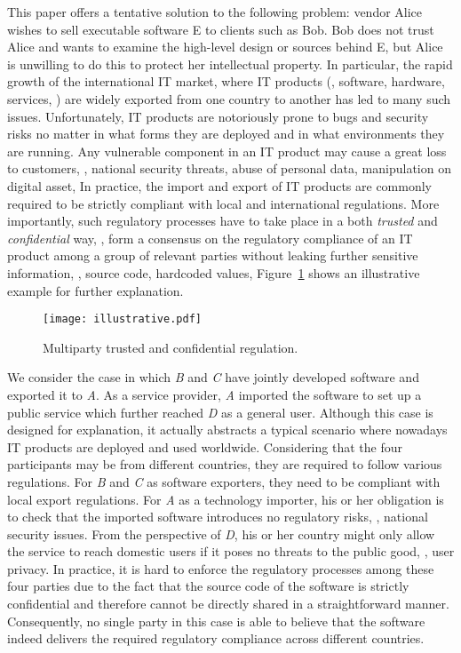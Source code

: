 This paper offers a tentative solution to the following problem: vendor Alice wishes to sell executable software E to clients such as Bob. Bob does not trust Alice and wants to examine the high-level design or sources behind E, but Alice is unwilling to do this to protect her intellectual property. 
In particular, the rapid growth of the international IT market, where IT products (\eg, software, hardware, services, \etc) 
are widely exported from one country to another has led to many such issues. Unfortunately, IT 
products are notoriously prone to bugs and security risks no matter in what 
forms they are deployed and in what environments they are running. Any vulnerable component 
in an IT product may cause a great loss to customers, \eg, national security 
threats, abuse of personal data, manipulation on digital asset, \etc In practice, the 
import and export of IT products are commonly required to be strictly compliant with 
local and international regulations. More importantly, such regulatory processes have to 
take place in a both \emph{trusted} and \emph{confidential} way, \ie, form a consensus 
on the regulatory compliance of an IT product among a group of relevant parties without 
leaking further sensitive information, \eg, source code, hardcoded values, \etc Figure~\ref{fig:illustrative} 
shows an illustrative example for further explanation.

\begin{figure}[h]
\centering
\texttt{[image: illustrative.pdf]}
\caption{\label{fig:illustrative}Multiparty trusted and confidential regulation.}
\end{figure}



We consider the case in which \emph{B} and \emph{C} have jointly developed software and exported it to \emph{A}. 
As a service provider, \emph{A} imported the software to set up a public service which further reached 
\emph{D} as a general user. Although this case is designed for explanation, it actually 
abstracts a typical scenario where nowadays IT products are deployed and used worldwide. 
Considering that the four participants may be from different countries, 
they are required to follow various regulations. 
For \emph{B} and \emph{C} as software exporters, they need to be compliant with local export regulations. 
For \emph{A} as a technology importer, his or her obligation is to check that the imported software introduces no 
regulatory risks, \eg, national security issues. From the perspective of \emph{D}, his or her country might 
only allow the service to reach domestic users if it poses no threats to the public good, \eg, user 
privacy. In practice, it is hard to enforce the regulatory processes among these 
four parties due to the fact that the source code of the software is strictly confidential 
and therefore cannot be directly shared in a straightforward manner. Consequently, 
no single party in this case is able to believe that the software indeed delivers the 
required regulatory compliance across different countries.


